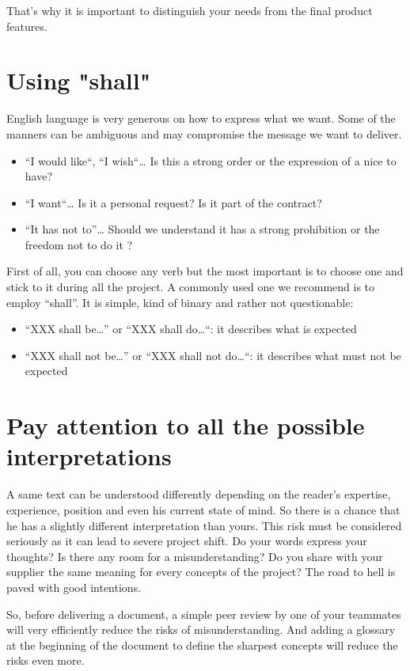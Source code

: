 That’s why it is important to distinguish your needs from the final product features.

\section{Using "shall"}
English language is very generous on how to express what we want. Some of the manners can be ambiguous and may compromise the message we want to deliver.

\begin{itemize}
    \item “I would like“, “I wish“… Is this a strong order or the expression of a nice to have?
    \item “I want“… Is it a personal request? Is it part of the contract?
    \item “It has not to”… Should we understand it has a strong prohibition or the freedom not to do it ?
\end{itemize}

First of all, you can choose any verb but the most important is to choose one and stick to it during all the project. A commonly used one we recommend is to employ “shall”. It is simple, kind of binary and rather not questionable:

\begin{itemize}
    \item “XXX shall be…” or “XXX shall do…“: it describes what is expected
    \item “XXX shall not be…” or “XXX shall not do…“: it describes what must not be expected
\end{itemize}

\section{Pay attention to all the possible interpretations}
A same text can be understood differently depending on the reader’s expertise, experience, position and even his current state of mind. So there is a chance that he has a slightly different interpretation than yours. This risk must be considered seriously as it can lead to severe project shift. Do your words express your thoughts? Is there any room for a misunderstanding? Do you share with your supplier the same meaning for every concepts of the project? The road to hell is paved with good intentions.

So, before delivering a document, a simple peer review by one of your teammates will very efficiently reduce the risks of misunderstanding. And adding a glossary at the beginning of the document to define the sharpest concepts will reduce the risks even more.


